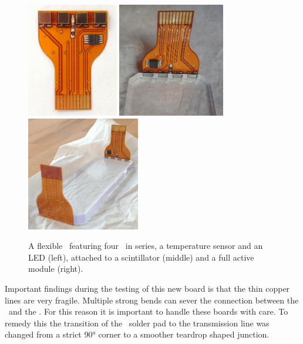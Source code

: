 \documentclass[../BTOF_summary.tex]{subfiles}
\begin{document}
\begin{figure}[htbp]
	\centering
	\includegraphics[height=5cm]{fig/SensorBoardNew2.png}
	\includegraphics[height=5cm]{fig/Sensorboards2Scintillator.jpg}
	\includegraphics[height=5cm]{fig/Sensorboards2Scintillator2.jpg}
	\caption[The flexible \sensorboard .]{A flexible \sensorboard\ featuring four \sipms\ in series, a temperature sensor and an LED (left), attached to a scintillator (middle) and a full active module (right).}
	\label{fig:SensorBoradNew}
\end{figure}

Important findings during the testing of this new board is that the thin copper lines are very fragile.
Multiple strong bends can sever the connection between the \sipms\ and the \railboard .
For this reason it is important to handle these boards with care.
To remedy this the transition of the \sipm\ solder pad to the transmission line was changed from a strict \ang{90} corner to a smoother teardrop shaped junction.
\end{document}

